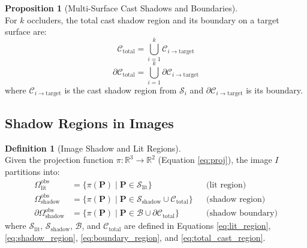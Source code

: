 \documentclass[12pt]{article}
\newcommand{\R}{\mathbb{R}}
\newcommand{\vect}[1]{\bm{#1}}
\theoremstyle{definition}
\newtheorem{definition}{Definition}[subsection]
\newtheorem{proposition}{Proposition}[subsection]
\begin{document}
\begin{proposition}[Multi-Surface Cast Shadows and Boundaries] \label{prop:multi_cast} ~\\
For $k$ occluders, the total cast shadow region and its boundary on a target surface are:
\begin{equation}
\boxed{\mathcal{C}_{\text{total}} = \bigcup_{i=1}^k \mathcal{C}_{i \to \text{target}} \label{eq:total_cast_region}}
\end{equation}
\begin{equation}
\boxed{\partial\mathcal{C}_{\text{total}} = \bigcup_{i=1}^k \partial\mathcal{C}_{i \to \text{target}} \label{eq:total_cast_boundary}}
\end{equation}
where $\mathcal{C}_{i \to \text{target}}$ is the cast shadow region from $\mathcal{S}_i$ and $\partial\mathcal{C}_{i \to \text{target}}$ is its boundary.
\end{proposition}

\subsection{Shadow Regions in Images} \label{sec:shadow_in_image}

\begin{definition}[Image Shadow and Lit Regions] \label{def:image_shadow_regions} ~\\
Given the projection function $\pi: \R^3 \to \R^2$ (Equation \eqref{eq:proj}), the image $I$ partitions into:
\begin{align}
\Omega_{\text{lit}}^{\text{obs}} &= \{\pi(\vect{P}) \mid \vect{P} \in \mathcal{S}_{\text{lit}}\} && \text{(lit region)} \label{eq:image_lit} \\
\Omega_{\text{shadow}}^{\text{obs}} &= \{\pi(\vect{P}) \mid \vect{P} \in \mathcal{S}_{\text{shadow}} \cup \mathcal{C}_{\text{total}}\} && \text{(shadow region)} \label{eq:image_shadow} \\
\partial\Omega_{\text{shadow}}^{\text{obs}} &= \{\pi(\vect{P}) \mid \vect{P} \in \mathcal{B} \cup \partial\mathcal{C}_{\text{total}}\} && \text{(shadow boundary)} \label{eq:image_boundary}
\end{align}
where $\mathcal{S}_{\text{lit}}$, $\mathcal{S}_{\text{shadow}}$, $\mathcal{B}$, and $\mathcal{C}_{\text{total}}$ are defined in Equations \eqref{eq:lit_region}, \eqref{eq:shadow_region}, \eqref{eq:boundary_region}, and \eqref{eq:total_cast_region}.
\end{definition}

\newpage
\end{document}

